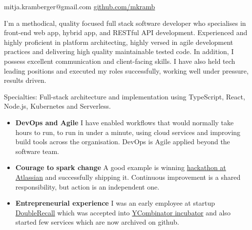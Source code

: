 \documentclass[10pt,a4paper]{article}
\begin{document}
\sloppy  %


\nobreakvspace{0.3em}  %

\noindent
mitja.kramberger@gmail.com\sbull
\href{http://github.com/mkramb}{github.com/mkramb}


\spacedhrule{0.9em}{-0.4em}  %
\vspace{-0em}  %

\noindent I'm a methodical, quality­ focused full stack software developer who specialises in front-end web app, hybrid app, and RESTful API development. 
\noindent Experienced and highly proficient in platform architecting, highly versed in agile development practices and delivering high quality maintainable tested code. 
\noindent In addition, I possess excellent communication and client-facing skills. I have also held tech leading positions and executed my roles successfully, working well under pressure, results driven.

\inlineheadsection  %
  {Specialties:}
  {Full-stack architecture and implementation using TypeScript, React, Node.js, Kubernetes and Serverless.}

\spacedhrule{1.5em}{-0.4em}



\begin{indentsection}
\item
\begin{itemize}[leftmargin=0cm]
    \item \textbf{DevOps and Agile} I have enabled workflows that would normally take hours to run, to run in under a minute, using cloud services and improving build tools across the organisation. DevOps is Agile applied beyond the software team.
    \item \textbf{Courage to spark change} A good example is winning {\href{https://youtu.be/gdmrfGAZB0g?t=415}{hackathon at Atlassian}} and successfully shipping it. Continuous improvement is a shared responsibility, but action is an independent one. 
    \item \textbf{Entrepreneurial experience} I was an early employee at startup {\href{https://www.linkedin.com/company/doublerecall}{DoubleRecall}} which was accepted into {\href{https://www.ycombinator.com/}{YCombinator incubator}}
    and also started few services which are now archived on github.
\end{itemize}
\end{indentsection}
\end{document}
